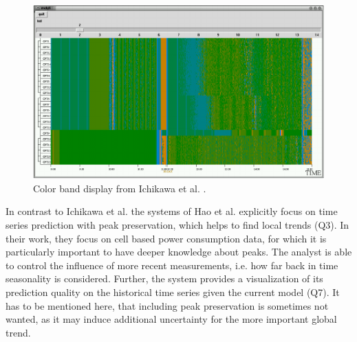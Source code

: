 \documentclass[electronic]{vgtc}             %
\begin{document}
\begin{figure}[!t]
	\centering
	\includegraphics[width=\columnwidth]{color-band}
	\caption{Color band display from Ichikawa et al. \cite{ichikawa:2002}.}
	\label{fig:color-band}
\end{figure}

In contrast to Ichikawa et al.\cite{ichikawa:2002} the systems of Hao et al. \cite{Hao:2011, Hao:2009} explicitly focus on time series prediction with peak preservation, which helps to find local trends (Q3).
In their work, they focus on cell based power consumption data, for which it is particularly important to have deeper knowledge about peaks.
The analyst is able to control the influence of more recent measurements, i.e. how far back in time seasonality is considered. 
Further, the system provides a visualization of its prediction quality on the historical time series given the current model (Q7). 
It has to be mentioned here, that including peak preservation is sometimes not wanted, as it may induce additional uncertainty for the more important global trend.
\end{document}
